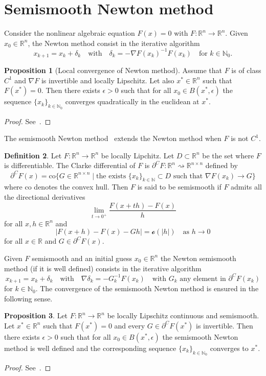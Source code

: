 \documentclass[a4paper,10pt,twoside]{amsbook}
\numberwithin{section}{chapter}
\numberwithin{equation}{chapter}
\theoremstyle{definition}
\newtheorem{prop}{Proposition}[chapter]
\newtheorem{defi}[prop]{Definition}
\begin{document}
\section{Semismooth Newton method}
\label{sec:seminewton}

Consider the nonlinear algebraic equation $F(x)=0$ with $F\colon\mathbb{R}^n\to\mathbb{R}^n$. Given $x_0\in\mathbb{R}^n$, the Newton method consist in the iterative algorithm
\[
x_{k+1}=x_k+\delta_k\quad\text{with}\quad\delta_k=-\nabla F(x_k)^{-1}F(x_k)\quad\text{for $k\in\mathbb{N}_0$}.
\]
\begin{prop}[Local convergence of Newton method]
Assume that $F$ is of class $C^1$ and $\nabla F$ is invertible and locally Lipschitz. Let also $x^*\in\mathbb{R}^n$ such that $F(x^*)=0$. Then there exists $\epsilon>0$ such that for all $x_0\in B(x^*,\epsilon)$ the sequence $\{x_k\}_{k\in\mathbb{N}_0}$ converges quadratically in the euclidean at $x^*$.
\end{prop}
\begin{proof}
See~\cite{hintermuller2011semismooth}.
\end{proof}
The semismooth Newton method~\cite{qi1993nonsmooth} extends the Newton method when $F$ is not $C^1$.
\begin{defi}
Let $F\colon\mathbb{R}^n\to\mathbb{R}^n$ be locally Lipchitz. Let $D\subset\mathbb{R}^n$ be the set where $F$ is differentiable. The Clarke differential of $F$ is $\partial^CF\colon\mathbb{R}^n\rightsquigarrow\mathbb{R}^{n\times n}$ defined by
\[
\partial^CF(x)=\text{co}\{G\in\mathbb{R}^{n\times n}\;|\;\text{the exists $\{x_k\}_{k\in\mathbb{N}}\subset D$ such that $\nabla F(x_k)\to G$}\}
\]
where $\text{co}$ denotes the convex hull. Then $F$ is said to be semismooth if $F$ admits all the directional derivatives
\[
\lim_{t\to 0^+}\frac{F(x+th)-F(x)}{h}
\]
for all $x,h\in\mathbb{R}^n$ and
\[
|F(x+h)-F(x)-Gh|=\mathscr{o}(|h|)\quad\text{as $h\to 0$}
\]
for all $x\in\mathbb{R}$ and $G\in\partial^C F(x)$.
\end{defi}
Given $F$ semismooth and an initial guess $x_0\in\mathbb{R}^n$ the Newton semismooth method (if it is well defined) consists in the iterative algorithm
\[
x_{k+1}=x_k+\delta_k\quad\text{with}\quad\nabla \delta_k=-G_k^{-1}F(x_k)\quad\text{with $G_k$ any element in $\partial^CF(x_k)$}
\]
for $k\in\mathbb{N}_0$. The convergence of the semismooth Newton method is ensured in the following sense.
\begin{prop}
Let $F\colon\mathbb{R}^n\to\mathbb{R}^n$ be locally Lipschitz continuous and semismooth. Let $x^*\in\mathbb{R}^n$ such that $F(x^*)=0$ and every $G\in\partial^C F(x^*)$ is invertible. Then there exists $\epsilon>0$ such that for all $x_0\in B(x^*,\epsilon)$ the semismooth Newton method is well defined and the corresponding sequence $\{x_k\}_{k\in\mathbb{N}_0}$ converges to $x^*$.
\end{prop}
\begin{proof}
See~\cite{hintermuller2011semismooth}.
\end{proof}
\end{document}
